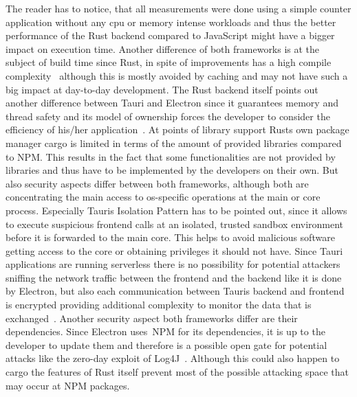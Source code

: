 The reader has to notice, that all measurements were done using a simple counter application without any cpu or memory intense workloads and thus the better performance of the Rust backend compared to JavaScript might have a bigger impact on execution time.
Another difference of both frameworks is at the subject of build time since Rust, in spite of improvements has a high compile complexity~\cite{rustCompileTime} although this is mostly avoided by caching and may not have such a big impact
at day-to-day development.
The Rust backend itself points out another difference between Tauri and Electron since it guarantees memory and thread safety and its model of ownership forces the developer to consider the efficiency of his/her application~\cite{klabnik2019rust}.
At points of library support Rusts own package manager cargo is limited in terms of the amount of provided libraries compared to \ac{NPM}.
This results in the fact that some functionalities are not provided by libraries and thus have to be implemented by the developers on their own.
But also security aspects differ between both frameworks, although both are concentrating the main access to os-specific operations at the main or core process.
Especially Tauris Isolation Pattern has to be pointed out, since it allows to execute suspicious frontend calls at an isolated, trusted sandbox environment before it is forwarded to the main core.
This helps to avoid malicious software getting access to the core or obtaining privileges it should not have.
Since Tauri applications are running serverless there is no possibility for potential attackers sniffing the network traffic between the frontend and the backend like it is done by Electron, but also each communication between Tauris backend and
frontend is encrypted providing additional complexity to monitor the data that is exchanged~\cite{tauri}.
Another security aspect both frameworks differ are their dependencies.
Since Electron uses~\ac{NPM} for its dependencies, it is up to the developer to update them and therefore is a possible open gate for potential attacks like the zero-day exploit of Log4J~\cite{bsi}.
Although this could also happen to cargo the features of Rust itself prevent most of the possible attacking space that may occur at \ac{NPM} packages.



